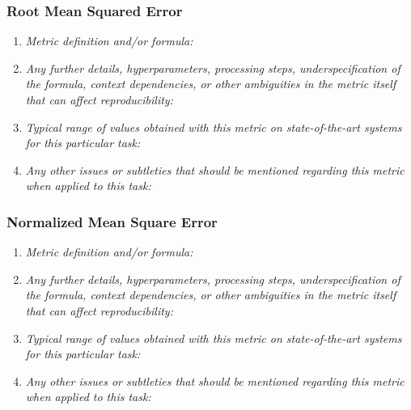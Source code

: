 \documentclass[a4paper,11pt]{article}
\begin{document}
        \subsubsection{Root Mean Squared Error}
            \begin{enumerate}[label=\alph*.]
                \item \textit{Metric definition and/or formula:}
                \bigskip
                \item \textit{Any further details, hyperparameters, processing steps, underspecification of the formula, context dependencies, or other ambiguities in the metric itself that can affect reproducibility:}
                \bigskip
                \item \textit{Typical range of values obtained with this metric on state-of-the-art systems for this particular task:}
                \bigskip
                \item \textit{Any other issues or subtleties that should be mentioned regarding this metric when applied to this task:}
                \bigskip
            \end{enumerate}
        \subsubsection{Normalized Mean Square Error}
            \begin{enumerate}[label=\alph*.]
                \item \textit{Metric definition and/or formula:}
                \bigskip
                \item \textit{Any further details, hyperparameters, processing steps, underspecification of the formula, context dependencies, or other ambiguities in the metric itself that can affect reproducibility:}
                \bigskip
                \item \textit{Typical range of values obtained with this metric on state-of-the-art systems for this particular task:}
                \bigskip
                \item \textit{Any other issues or subtleties that should be mentioned regarding this metric when applied to this task:}
                \bigskip
            \end{enumerate}
\end{document}
